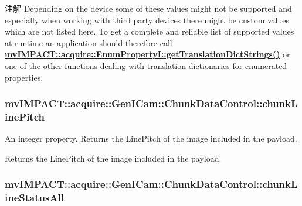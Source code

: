 \begin{DoxyNote}{注解}
Depending on the device some of these values might not be supported and especially when working with third party devices there might be custom values which are not listed here. To get a complete and reliable list of supported values at runtime an application should therefore call {\bfseries \hyperlink{classmv_i_m_p_a_c_t_1_1acquire_1_1_enum_property_i_a0ba6ccbf5ee69784d5d0b537924d26b6}{mv\+I\+M\+P\+A\+C\+T\+::acquire\+::\+Enum\+Property\+I\+::get\+Translation\+Dict\+Strings()}} or one of the other functions dealing with translation dictionaries for enumerated properties. 
\end{DoxyNote}
\hypertarget{classmv_i_m_p_a_c_t_1_1acquire_1_1_gen_i_cam_1_1_chunk_data_control_a058ff2d5680ac5df29d70b5c78542974}{
\subsubsection[{chunk\+Line\+Pitch}]{ mv\+I\+M\+P\+A\+C\+T\+::acquire\+::\+Gen\+I\+Cam\+::\+Chunk\+Data\+Control\+::chunk\+Line\+Pitch}}\label{classmv_i_m_p_a_c_t_1_1acquire_1_1_gen_i_cam_1_1_chunk_data_control_a058ff2d5680ac5df29d70b5c78542974}


An integer property. Returns the Line\+Pitch of the image included in the payload. 

Returns the Line\+Pitch of the image included in the payload. \hypertarget{classmv_i_m_p_a_c_t_1_1acquire_1_1_gen_i_cam_1_1_chunk_data_control_aefb276829f054332349de8fa7eb5125f}{
\subsubsection[{chunk\+Line\+Status\+All}]{ mv\+I\+M\+P\+A\+C\+T\+::acquire\+::\+Gen\+I\+Cam\+::\+Chunk\+Data\+Control\+::chunk\+Line\+Status\+All}}\label{classmv_i_m_p_a_c_t_1_1acquire_1_1_gen_i_cam_1_1_chunk_data_control_aefb276829f054332349de8fa7eb5125f}


